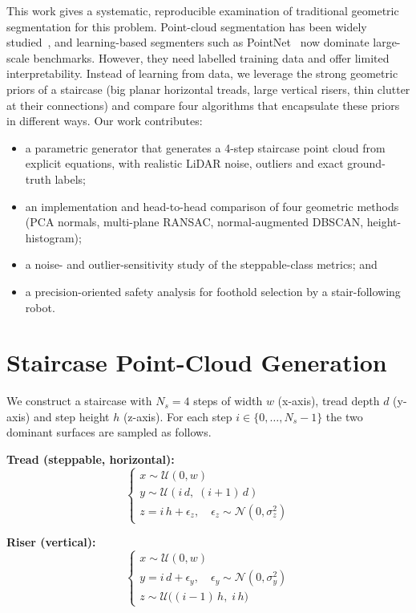 \documentclass[conference]{IEEEtran}
\begin{document}
This work gives a systematic, reproducible examination of traditional geometric
segmentation for this problem. Point-cloud segmentation has been widely
studied~\cite{nguyen2013segmentation}, and learning-based segmenters such as
PointNet~\cite{qi2017pointnet} now dominate large-scale benchmarks. However, they
need labelled training data and offer limited interpretability. Instead of learning
from data, we leverage the strong geometric priors of a staircase (big planar
horizontal treads, large vertical risers, thin clutter at their connections) and
compare four algorithms that encapsulate these priors in different ways. Our work
contributes:
\begin{itemize}
\item a parametric generator that generates a 4-step staircase point cloud from
explicit equations, with realistic LiDAR noise, outliers and exact ground-truth
labels;
\item an implementation and head-to-head comparison of four geometric methods
(PCA normals, multi-plane RANSAC, normal-augmented DBSCAN, height-histogram);
\item a noise- and outlier-sensitivity study of the steppable-class metrics; and
\item a precision-oriented safety analysis for foothold selection by a
stair-following robot.
\end{itemize}

\section{Staircase Point-Cloud Generation}
\label{sec:data}
We construct a staircase with $N_s=4$ steps of width $w$ (x-axis), tread depth $d$
(y-axis) and step height $h$ (z-axis). For each step $i\in\{0,\dots,N_s-1\}$ the two
dominant surfaces are sampled as follows.

\textbf{Tread (steppable, horizontal):}
\begin{equation}
\begin{cases}
x \sim \mathcal{U}(0, w) \\
y \sim \mathcal{U}(i\,d,\; (i{+}1)\,d) \\
z = i\,h + \epsilon_z, \quad \epsilon_z \sim \mathcal{N}(0, \sigma_z^2)
\end{cases}
\label{eq:tread}
\end{equation}

\textbf{Riser (vertical):}
\begin{equation}
\begin{cases}
x \sim \mathcal{U}(0, w) \\
y = i\,d + \epsilon_y, \quad \epsilon_y \sim \mathcal{N}(0, \sigma_y^2) \\
z \sim \mathcal{U}\big((i{-}1)\,h,\; i\,h\big)
\end{cases}
\label{eq:riser}
\end{equation}
\end{document}
